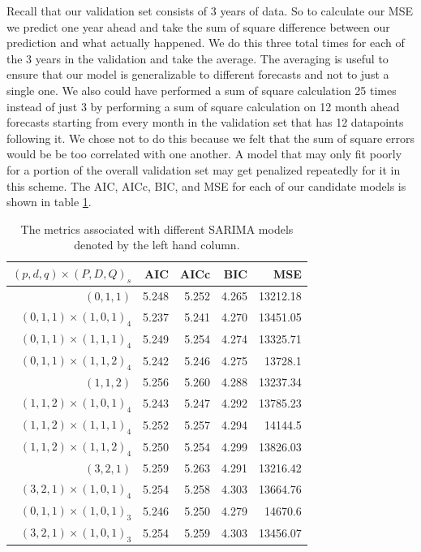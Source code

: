 \documentclass[11pt]{paper}
\begin{document}
Recall that our validation set consists of 3 years of data. So to calculate our MSE we predict one year ahead and take the sum of square difference between our prediction and what actually happened. We do this three total times for each of the 3 years in the validation and take the average. The averaging is useful to ensure that our model is generalizable to different forecasts and not to just a single one. We also could have performed a sum of square calculation 25 times instead of just 3 by performing a sum of square calculation on 12 month ahead forecasts starting from every month in the validation set that has 12 datapoints following it. We chose not to do this because we felt that the sum of square errors would be be too correlated with one another. A model that may only fit poorly for a portion of the overall validation set may get penalized repeatedly for it in this scheme. The AIC, AICc, BIC, and MSE for each of our candidate models is shown in table \ref{results}.

\begin{table}
\centering
\begin{tabular}{r || r | r| r| r}
$(p, d, q) \times(P, D, Q)_s$   & AIC   &AICc   &BIC    &MSE\\
\hline
$(0, 1, 1)$               & 5.248 &5.252  &4.265  &13212.18\\
$(0, 1, 1) \times (1, 0, 1)_4$   & 5.237 &5.241  &4.270  &13451.05\\ %
$(0, 1, 1) \times (1, 1, 1)_4$   & 5.249 &5.254  &4.274  &13325.71\\
$(0, 1, 1) \times (1, 1, 2)_4$   & 5.242 &5.246  &4.275  &13728.1\\
\hline
$(1, 1, 2)$               & 5.256 & 5.260 &4.288  &13237.34\\
$(1, 1, 2) \times (1, 0, 1)_4$   & 5.243 &5.247  &4.292  &13785.23\\ %
$(1, 1, 2) \times (1, 1, 1)_4$   & 5.252 & 5.257 &4.294  &14144.5\\
$(1, 1, 2)\times (1, 1, 2)_4$   & 5.250 & 5.254 & 4.299 &13826.03\\
\hline
$(3, 2, 1)$             & 5.259& 5.263& 4.291 & 13216.42\\
$(3, 2, 1) \times (1, 0, 1)_4$ & 5.254& 5.258 & 4.303 &13664.76\\
\hline
$(0, 1, 1) \times (1, 0, 1)_3$ & 5.246 & 5.250 & 4.279 & 14670.6\\
$(3, 2, 1) \times (1, 0, 1)_3$ & 5.254 & 5.259 & 4.303 & 13456.07
\end{tabular}
\caption{The metrics associated with different SARIMA models denoted by the left hand column.}
\label{results}
\end{table}
\end{document}
